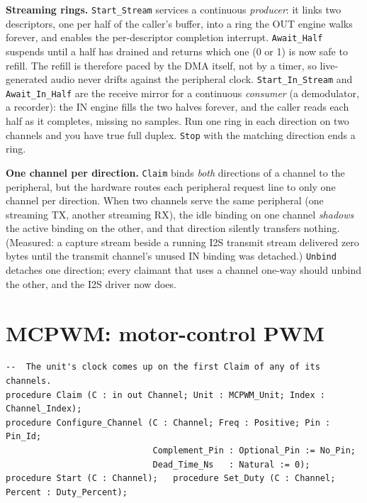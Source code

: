 \textbf{Streaming rings.} \texttt{Start\_Stream} services a continuous
\emph{producer}: it links two descriptors, one per half of the caller's buffer,
into a ring the OUT engine walks forever, and enables the per-descriptor
completion interrupt. \texttt{Await\_Half} suspends until a half has drained
and returns which one (0 or 1) is now safe to refill. The refill is therefore
paced by the DMA itself, not by a timer, so live-generated audio never drifts
against the peripheral clock. \texttt{Start\_In\_Stream} and
\texttt{Await\_In\_Half} are the receive mirror for a continuous
\emph{consumer} (a demodulator, a recorder): the IN engine fills the two halves
forever, and the caller reads each half as it completes, missing no samples.
Run one ring in each direction on two channels and you have true full duplex.
\texttt{Stop} with the matching direction ends a ring.

\textbf{One channel per direction.} \texttt{Claim} binds \emph{both}
directions of a channel to the peripheral, but the hardware routes each
peripheral request line to only one channel per direction. When two channels
serve the same peripheral (one streaming TX, another streaming RX), the idle
binding on one channel \emph{shadows} the active binding on the other, and that
direction silently transfers nothing. (Measured: a capture stream beside a
running I2S transmit stream delivered zero bytes until the transmit channel's
unused IN binding was detached.) \texttt{Unbind} detaches one direction; every
claimant that uses a channel one-way should unbind the other, and the I2S driver
now does.

\section{MCPWM: motor-control PWM}

\begin{lstlisting}
--  The unit's clock comes up on the first Claim of any of its channels.
procedure Claim (C : in out Channel; Unit : MCPWM_Unit; Index : Channel_Index);
procedure Configure_Channel (C : Channel; Freq : Positive; Pin : Pin_Id;
                             Complement_Pin : Optional_Pin := No_Pin;
                             Dead_Time_Ns   : Natural := 0);
procedure Start (C : Channel);   procedure Set_Duty (C : Channel; Percent : Duty_Percent);
\end{lstlisting}

